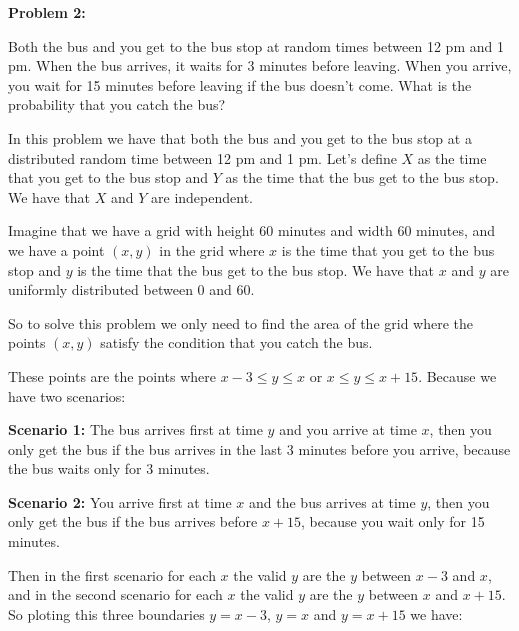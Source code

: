 \textbf{Problem 2:}

\singlespacing

Both the bus and you get to the bus stop at random times between 12 pm
and 1 pm. When the bus arrives, it waits for 3 minutes before leaving.
When you arrive, you wait for 15 minutes before leaving if the bus
doesn't come. What is the probability that you catch the bus?

\singlespacing
\singlespacing

In this problem we have that both the bus and you get to the bus stop
at a distributed random time between 12 pm and 1 pm. Let's define $X$
as the time that you get to the bus stop and $Y$ as the time that the
bus get to the bus stop. We have that $X$ and $Y$ are independent.

\singlespacing
\singlespacing

Imagine that we have a grid with height $60$ minutes and width $60$
minutes, and we have a point $(x, y)$ in the grid where $x$ is the
time that you get to the bus stop and $y$ is the time that the bus
get to the bus stop. We have that $x$ and $y$ are uniformly distributed
between $0$ and $60$.

\singlespacing
\singlespacing

So to solve this problem we only need to find the area of the grid where
the points $(x, y)$ satisfy the condition that you catch the bus.

\singlespacing
\singlespacing

These points are the points where $x-3 \leq y \leq x$ or $x \leq y \leq x+15$.
Because we have two scenarios:

\singlespacing
\singlespacing
\singlespacing

\textbf{Scenario 1:} The bus arrives first at time $y$ and you arrive
at time $x$, then you only get the bus if the bus arrives in the
last 3 minutes before you arrive, because the bus waits only for 3 minutes.

\singlespacing
\singlespacing
\singlespacing

\textbf{Scenario 2:} You arrive first at time $x$ and the bus arrives
at time $y$, then you only get the bus if the bus arrives before $x + 15$,
because you wait only for 15 minutes.

\singlespacing
\singlespacing

Then in the first scenario for each $x$ the valid $y$ are the $y$ between
$x - 3$ and $x$, and in the second scenario for each $x$ the valid $y$
are the $y$ between $x$ and $x + 15$. So ploting this three boundaries
$y = x - 3$, $y = x$ and $y = x + 15$ we have:

